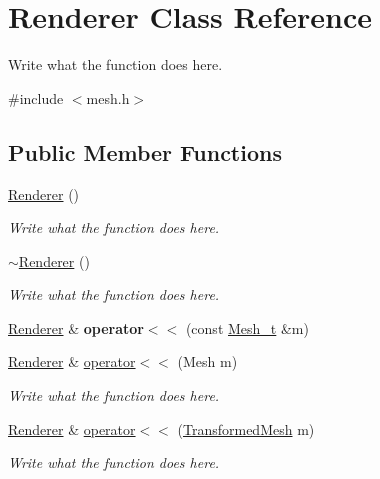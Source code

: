 \hypertarget{classRenderer}{\section{Renderer Class Reference}
\label{classRenderer}
}


Write what the function does here.  




{\ttfamily \#include $<$mesh.\+h$>$}

\subsection*{Public Member Functions}
\begin{DoxyCompactItemize}
\item 
\hyperlink{classRenderer_a7ebf46f54dab9905f79b80f7fddb76a6}{Renderer} ()
\begin{DoxyCompactList}\small\item\em Write what the function does here. \end{DoxyCompactList}\item 
\hyperlink{classRenderer_afeee408862d5bd6255a6882d47e6d5cd}{$\sim$\+Renderer} ()
\begin{DoxyCompactList}\small\item\em Write what the function does here. \end{DoxyCompactList}\item 
\hypertarget{classRenderer_a4ff6cacc462fdb62e6877aa53c908cc3}{\hyperlink{classRenderer}{Renderer} \& {\bfseries operator$<$$<$} (const \hyperlink{classMesh__t}{Mesh\+\_\+t} \&m)}\label{classRenderer_a4ff6cacc462fdb62e6877aa53c908cc3}

\item 
\hyperlink{classRenderer}{Renderer} \& \hyperlink{classRenderer_addf730ae72101f85f0855401fb49bc80}{operator$<$$<$} (Mesh m)
\begin{DoxyCompactList}\small\item\em Write what the function does here. \end{DoxyCompactList}\item 
\hyperlink{classRenderer}{Renderer} \& \hyperlink{classRenderer_a35ce4d4ceb550c593bd52fe8f03dc835}{operator$<$$<$} (\hyperlink{structTransformedMesh}{Transformed\+Mesh} m)
\begin{DoxyCompactList}\small\item\em Write what the function does here. \end{DoxyCompactList}\end{DoxyCompactItemize}
